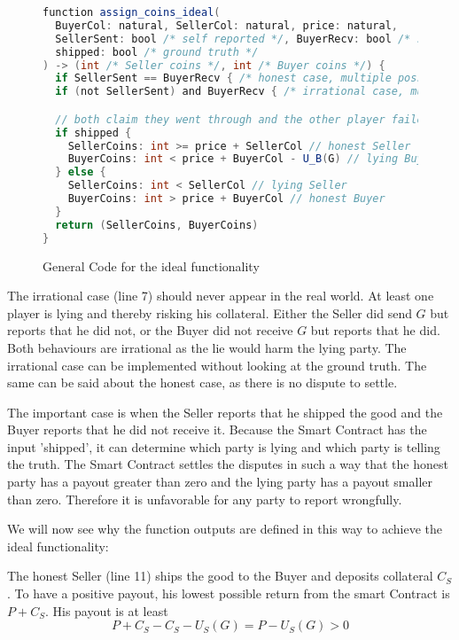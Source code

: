 \documentclass{cacthesis}
\begin{document}
\begin{figure}[htbp!]
    \centering
\begin{lstlisting}[language=java]
function assign_coins_ideal(
  BuyerCol: natural, SellerCol: natural, price: natural,
  SellerSent: bool /* self reported */, BuyerRecv: bool /* self reported */, 
  shipped: bool /* ground truth */
) -> (int /* Seller coins */, int /* Buyer coins */) {
  if SellerSent == BuyerRecv { /* honest case, multiple possible solutions  */ }
  if (not SellerSent) and BuyerRecv { /* irrational case, multiple possible solutions */ }

  // both claim they went through and the other player failed
  if shipped {
    SellerCoins: int >= price + SellerCol // honest Seller
    BuyerCoins: int < price + BuyerCol - U_B(G) // lying Buyer
  } else {
    SellerCoins: int < SellerCol // lying Seller
    BuyerCoins: int > price + BuyerCol // honest Buyer
  }
  return (SellerCoins, BuyerCoins)
}
\end{lstlisting}
\label{fig:code_ideal_sc}
    \caption{General Code for the ideal functionality}
\end{figure}
The irrational case (line 7) should never appear in the real world. At least one player is lying and thereby risking his collateral. Either the Seller did send $G$ but reports that he did not, or the Buyer did not receive $G$ but reports that he did. Both behaviours are irrational as the lie would harm the lying party. The irrational case can be implemented without looking at the ground truth. The same can be said about the honest case, as there is no dispute to settle.\newline

The important case is when the Seller reports that he shipped the good and the Buyer reports that he did not receive it. Because the Smart Contract has the input 'shipped', it can determine which party is lying and which party is telling the truth.
The Smart Contract settles the disputes in such a way that the honest party has a payout greater than zero and the lying party has a payout smaller than zero. Therefore it is unfavorable for any party to report wrongfully.\newline

We will now see why the function outputs are defined in this way to achieve the ideal functionality:\newline

The honest Seller (line 11) ships the good to the Buyer and deposits collateral $C_S$. To have a positive payout, his lowest possible return from the smart Contract is $P + C_S$. His payout is at least
\[P + C_S - C_S - U_S(G) = P - U_S(G) > 0\]
\end{document}
